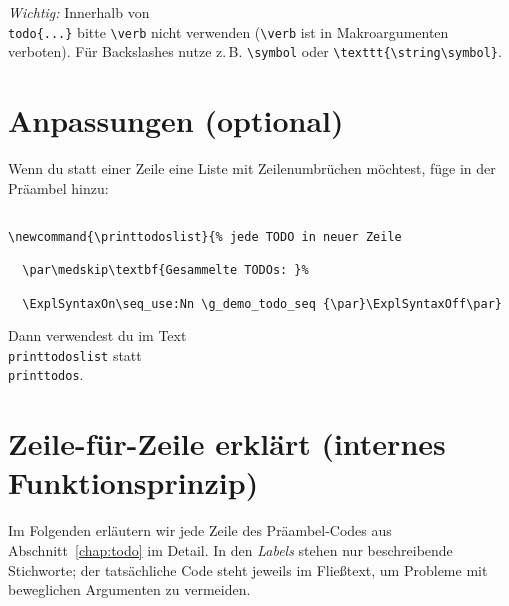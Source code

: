 \documentclass[11pt,a4paper]{book}
\newcommand{\todo}[1]{\textbf{TODO:}~#1\ExplSyntaxOn\demo_todo_add:n{#1}\ExplSyntaxOff}
\newcommand{\printtodos}{\par\medskip\textbf{Gesammelte TODOs: }\ExplSyntaxOn\seq_use:Nn \g_demo_todo_seq {; }\ExplSyntaxOff\par}
\begin{document}
\textit{Wichtig:} Innerhalb von \texttt{\\todo\{...\}} bitte \verb|\verb| nicht verwenden (\verb|\verb| ist in Makroargumenten verboten). Für Backslashes nutze z.\,B. \texttt{\textbackslash symbol} oder \verb|\texttt{\string\symbol}|.



\section{Anpassungen (optional)}

Wenn du statt einer Zeile eine Liste mit Zeilenumbrüchen möchtest, füge in der Präambel hinzu:

\begin{verbatim}

\newcommand{\printtodoslist}{% jede TODO in neuer Zeile

  \par\medskip\textbf{Gesammelte TODOs: }% 

  \ExplSyntaxOn\seq_use:Nn \g_demo_todo_seq {\par}\ExplSyntaxOff\par}

\end{verbatim}

Dann verwendest du im Text \texttt{\\printtodoslist} statt \texttt{\\printtodos}.
\section{Zeile-für-Zeile erklärt (internes Funktionsprinzip)}
Im Folgenden erläutern wir jede Zeile des Präambel-Codes aus Abschnitt~\ref{chap:todo} im Detail. In den \emph{Labels} stehen nur beschreibende Stichworte; der tatsächliche Code steht jeweils im Fließtext, um Probleme mit beweglichen Argumenten zu vermeiden.
\end{document}
